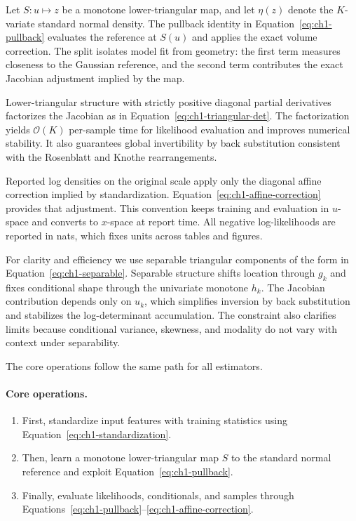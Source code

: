 \documentclass[11pt,a4paper,twoside]{book}\usepackage[]{graphicx}\usepackage[]{xcolor}
\begin{document}
Let $S:u\mapsto z$ be a monotone lower-triangular map, and let $\eta(z)$ denote the $K$-variate standard normal density. The pullback identity in Equation~\eqref{eq:ch1-pullback} evaluates the reference at $S(u)$ and applies the exact volume correction. The split isolates model fit from geometry: the first term measures closeness to the Gaussian reference, and the second term contributes the exact Jacobian adjustment implied by the map.
\medskip

Lower-triangular structure with strictly positive diagonal partial derivatives factorizes the Jacobian as in Equation~\eqref{eq:ch1-triangular-det}. The factorization yields $\mathcal{O}(K)$ per-sample time for likelihood evaluation and improves numerical stability. It also guarantees global invertibility by back substitution consistent with the Rosenblatt and Knothe rearrangements.
\medskip

Reported log densities on the original scale apply only the diagonal affine correction implied by standardization. Equation~\eqref{eq:ch1-affine-correction} provides that adjustment. This convention keeps training and evaluation in $u$-space and converts to $x$-space at report time. All negative log-likelihoods are reported in nats, which fixes units across tables and figures.
\medskip

For clarity and efficiency we use separable triangular components of the form in Equation~\eqref{eq:ch1-separable}. Separable structure shifts location through $g_k$ and fixes conditional shape through the univariate monotone $h_k$. The Jacobian contribution depends only on $u_k$, which simplifies inversion by back substitution and stabilizes the log-determinant accumulation. The constraint also clarifies limits because conditional variance, skewness, and modality do not vary with context under separability.

The core operations follow the same path for all estimators.
\paragraph{Core operations.}
\begin{enumerate}
  \item First, standardize input features with training statistics using Equation~\eqref{eq:ch1-standardization}.
  \item Then, learn a monotone lower-triangular map $S$ to the standard normal reference and exploit Equation~\eqref{eq:ch1-pullback}.
  \item Finally, evaluate likelihoods, conditionals, and samples through Equations~\eqref{eq:ch1-pullback}--\eqref{eq:ch1-affine-correction}.
\end{enumerate}
\end{document}
